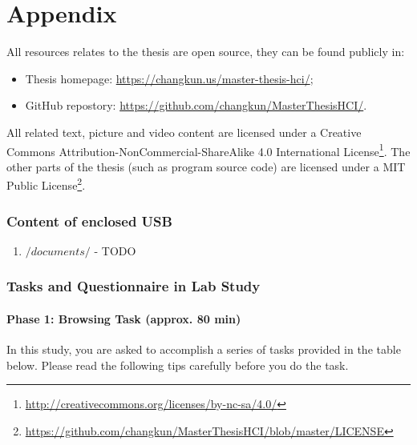 \part*{Appendix}
\appendix
{}
\fancyhead[LE,RO,LO,RE]{}

All resources relates to the thesis are open source, they can be found publicly in:

\begin{itemize}
    \item Thesis homepage: \url{https://changkun.us/master-thesis-hci/};
    \item GitHub repostory: \url{https://github.com/changkun/MasterThesisHCI/}.
\end{itemize}

All related text, picture and video content are licensed under a Creative Commons Attribution-NonCommercial-ShareAlike 4.0 International License\footnote{\url{http://creativecommons.org/licenses/by-nc-sa/4.0/}}.
The other parts of the thesis (such as program source code) are licensed under a MIT Public License\footnote{\url{https://github.com/changkun/MasterThesisHCI/blob/master/LICENSE}}.

\section{Content of enclosed USB}
\label{appendix:a}

\begin{enumerate}
    \item $/documents/$ - TODO
\end{enumerate}


\section{Tasks and Questionnaire in Lab Study}
\label{appendix:b}

\subsection{Phase 1: Browsing Task (approx. 80 min)}

In this study, you are asked to accomplish a series of tasks provided in the table below.
Please read the following tips carefully before you do the task.

